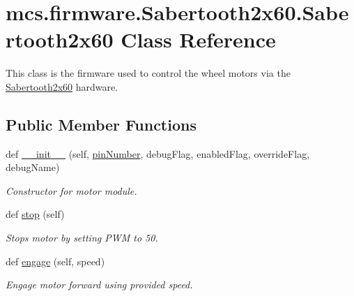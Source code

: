 \hypertarget{classmcs_1_1firmware_1_1Sabertooth2x60_1_1Sabertooth2x60}{}\section{mcs.\+firmware.\+Sabertooth2x60.\+Sabertooth2x60 Class Reference}
\label{classmcs_1_1firmware_1_1Sabertooth2x60_1_1Sabertooth2x60}


This class is the firmware used to control the wheel motors via the \hyperlink{classmcs_1_1firmware_1_1Sabertooth2x60_1_1Sabertooth2x60}{Sabertooth2x60} hardware.  


\subsection*{Public Member Functions}
\begin{DoxyCompactItemize}
\item 
def \hyperlink{classmcs_1_1firmware_1_1Sabertooth2x60_1_1Sabertooth2x60_a938a9afaddcc403820d6df881da6ed58}{\+\_\+\+\_\+init\+\_\+\+\_\+} (self, \hyperlink{classmcs_1_1firmware_1_1Sabertooth2x60_1_1Sabertooth2x60_a7ecd96fe9fd037dd332643107aa3ea8b}{pin\+Number}, debug\+Flag, enabled\+Flag, override\+Flag, debug\+Name)
\begin{DoxyCompactList}\small\item\em Constructor for motor module. \end{DoxyCompactList}\item 
\mbox{\label{classmcs_1_1firmware_1_1Sabertooth2x60_1_1Sabertooth2x60_ad9758facefa9d1a1c309b9a6de904481}} 
def \hyperlink{classmcs_1_1firmware_1_1Sabertooth2x60_1_1Sabertooth2x60_ad9758facefa9d1a1c309b9a6de904481}{stop} (self)
\begin{DoxyCompactList}\small\item\em Stops motor by setting P\+WM to 50. \end{DoxyCompactList}\item 
def \hyperlink{classmcs_1_1firmware_1_1Sabertooth2x60_1_1Sabertooth2x60_a8601746432a83420a0dc12580cd025b0}{engage} (self, speed)
\begin{DoxyCompactList}\small\item\em Engage motor forward using provided speed. \end{DoxyCompactList}\end{DoxyCompactItemize}
